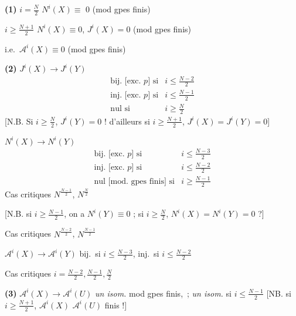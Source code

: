 \documentclass[11pt,a4paper]{article}
\begin{document}
\textbf{(1)} \quad \struck{\ill{}} $i = \frac{N}{2}$ \quad
$N^{i}(X) \equiv$ \struck{\ill{}} $0$ \quad (mod gpes finis)

$i \geqslant \frac{N+1}{2}$ \quad $N^{i}(X) \equiv 0$, \quad $J^{i}(X) = 0$
\quad (mod gpes finis)

i.e.\ $\mathcal{A}^{i}(X) \equiv 0$ \quad (mod gpes finis)

\textbf{(2)} \quad $J^{i}(X) \to J^{i}(Y)$
\[
\begin{array}{lll}
\text{bij.\ [exc.\ } p\text{] si} & i \leqslant \frac{N-2}{2} \\[2pt]
\text{inj.\ [exc.\ } p\text{] si} & i \leqslant \frac{N-1}{2} \\[2pt]
\text{nul si} & i \geqslant \frac{N}{2}
\end{array}
\]
[N.B. Si $i \geqslant \frac{N}{2}$, $J^{i}(Y) = 0$ ! d'ailleurs si
$i \geqslant \frac{N+1}{2}$, \ill{} $J^{i}(X) = J^{i}(Y) = 0$]

$N^{i}(X) \to N^{i}(Y)$
\[
\begin{array}{lll}
\text{bij.\ [exc.\ } p\text{] si} & i \leqslant \frac{N-3}{2} \\[2pt]
\text{inj.\ [exc.\ } p\text{] si} & i \leqslant \frac{N-2}{2} \\[2pt]
\text{nul [mod.\ gpes finis] si} & i \geqslant \frac{N-1}{2}
\end{array}
\]
Cas critiques $N^{\frac{N-1}{2}}$, $N^{\frac{N}{2}}$

[N.B. si $i \geqslant \frac{N-1}{2}$, on a $N^{i}(Y) \equiv 0$ ; si
$i \geqslant \frac{N}{2}$, \ill{} $N^{i}(X) = N^{i}(Y) = 0$ ?]

Cas critiques $N^{\frac{N-2}{2}}$, $N^{\frac{N-1}{2}}$


$\mathcal{A}^{i}(X) \to \mathcal{A}^{i}(Y)$ \quad bij.\ si
$i \leqslant \frac{N-3}{2}$, \quad inj.\ si $i \leqslant \frac{N-2}{2}$

Cas critiques $i = \frac{N-2}{2}, \frac{N-1}{2}, \frac{N}{2}$

\textbf{(3)} \quad $\mathcal{A}^{i}(X) \longrightarrow \mathcal{A}^{i}(U)$
\quad \emph{un isom.} mod gpes finis, \,; \emph{un isom.} si
$i \leqslant \frac{N-1}{2}$ [NB. si \struck{\ill{}} $i \geqslant \frac{N+1}{2}$,
$\mathcal{A}^{i}(X)$  $\mathcal{A}^{i}(U)$ 
finis !]
\end{document}
